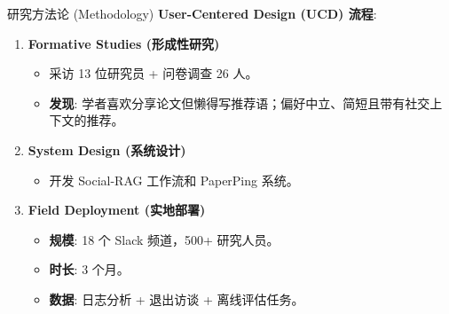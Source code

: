 \documentclass[aspectratio=169]{beamer}
\begin{document}
\begin{frame}{研究方法论 (Methodology)}
    \textbf{User-Centered Design (UCD) 流程}:
    \vspace{0.5cm}
    \begin{enumerate}
        \item \textbf{Formative Studies (形成性研究)}
        \begin{itemize}
            \item 采访 13 位研究员 + 问卷调查 26 人。
            \item \textbf{发现}: 学者喜欢分享论文但懒得写推荐语；偏好中立、简短且带有社交上下文的推荐。
        \end{itemize}
        \vspace{0.3cm}
        \item \textbf{System Design (系统设计)}
        \begin{itemize}
            \item 开发 Social-RAG 工作流和 PaperPing 系统。
        \end{itemize}
        \vspace{0.3cm}
        \item \textbf{Field Deployment (实地部署)}
        \begin{itemize}
            \item \textbf{规模}: 18 个 Slack 频道，500+ 研究人员。
            \item \textbf{时长}: 3 个月。
            \item \textbf{数据}: 日志分析 + 退出访谈 + 离线评估任务。
        \end{itemize}
    \end{enumerate}
\end{frame}
\end{document}
